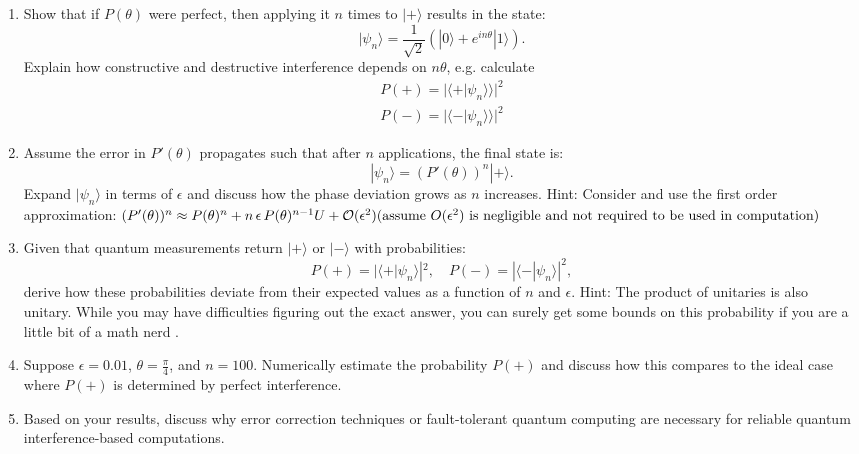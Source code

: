 \documentclass[12pt]{article}
\begin{document}
\begin{enumerate}
    \item Show that if \( P(\theta) \) were perfect, then applying it \( n \) times to \( |+\rangle \) results in the state:
    \[
    |\psi_n\rangle = \frac{1}{\sqrt{2}} (|0\rangle + e^{in\theta} |1\rangle).
    \]
    Explain how constructive and destructive interference depends on \( n \theta \), e.g. calculate
    \begin{align*}
        P(+) = |\langle + | \psi_n \rangle \rangle|^2 \\ 
        P(-) = |\langle - | \psi_n \rangle \rangle|^2 
    \end{align*}
    
    \item Assume the error in \( P'(\theta) \) propagates such that after \( n \) applications, the final state is:
    \[
    |\psi_n\rangle = (P'(\theta))^n |+\rangle.
    \]
    Expand \( |\psi_n\rangle \) in terms of \( \epsilon \) and discuss how the phase deviation grows as \( n \) increases. Hint: Consider and use the first order approximation: $(P'(\theta))^n \approx P(\theta)^n + n\,\epsilon\, P(\theta)^{n-1} U + \mathcal{O}(\epsilon^2) \quad \\ (\text{assume  } O(\epsilon^2) \text{ is negligible and not required to be used in computation})$
    
    \item Given that quantum measurements return \( |+\rangle \) or \( |-\rangle \) with probabilities:
    \[
    P(+) = |\langle + | \psi_n \rangle|^2, \quad P(-) = |\langle - | \psi_n \rangle|^2,
    \]
    derive how these probabilities deviate from their expected values as a function of \( n \) and \( \epsilon \). Hint: The product of unitaries is also unitary. While you may have difficulties figuring out the exact answer, you can surely get some bounds on this probability if you are a little bit of a math nerd \smiley{}.
    
    
    \item Suppose \( \epsilon = 0.01 \), \( \theta = \frac{\pi}{4} \), and \( n = 100 \). Numerically estimate the probability \( P(+) \) and discuss how this compares to the ideal case where \( P(+) \) is determined by perfect interference.
    
    \item Based on your results, discuss why error correction techniques or fault-tolerant quantum computing are necessary for reliable quantum interference-based computations.
\end{enumerate}
\end{document}
